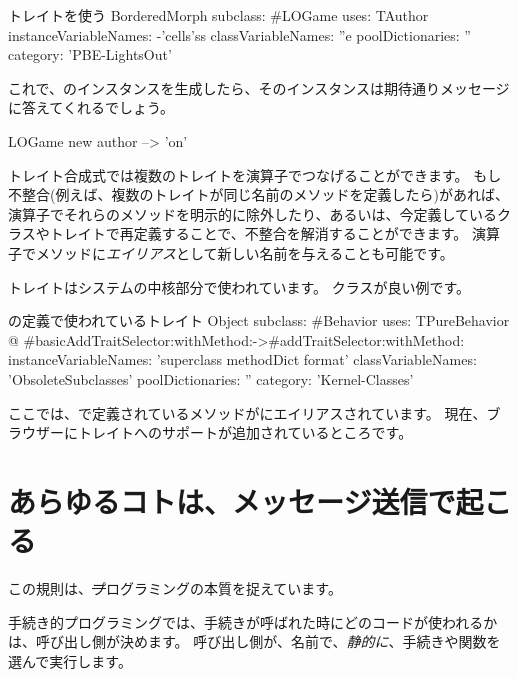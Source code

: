 \documentclass[a4paper,10pt,twoside]{book}
\begin{document}
\begin{classdef}[sbegamewithtrait]{トレイトを使う}
BorderedMorph subclass: #LOGame
	uses: TAuthor
	instanceVariableNames: -'cells'ss
	classVariableNames: ''e
	poolDictionaries: ''
	category: 'PBE-LightsOut'
\end{classdef}

これで、のインスタンスを生成したら、そのインスタンスは期待通りメッセージに答えてくれるでしょう。

\begin{code}{}
LOGame new author --> 'on'
\end{code}

トレイト合成式では複数のトレイトを\ct{+}演算子でつなげることができます。
もし不整合(例えば、複数のトレイトが同じ名前のメソッドを定義したら)があれば、\ct{-}演算子でそれらのメソッドを明示的に除外したり、あるいは、今定義しているクラスやトレイトで再定義することで、不整合を解消することができます。
演算子でメソッドに\emph{エイリアス}として新しい名前を与えることも可能です。

トレイトはシステムの中核部分で使われています。
\mbox{}クラスが良い例です。

\begin{classdef}[behaviorwithtraits]{の定義で使われているトレイト}
Object subclass: #Behavior
	uses: TPureBehavior @ {#basicAddTraitSelector:withMethod:->#addTraitSelector:withMethod:}
	instanceVariableNames: 'superclass methodDict format'
	classVariableNames: 'ObsoleteSubclasses'
	poolDictionaries: ''
	category: 'Kernel-Classes'
\end{classdef}
\noindent
ここでは、で定義されているメソッドがにエイリアスされています。
現在、ブラウザーにトレイトへのサポートが追加されているところです。

\section{あらゆるコトは、メッセージ送信で起こる}


この規則は、\st プログラミングの本質を捉えています。

手続き的プログラミングでは、手続きが呼ばれた時にどのコードが使われるかは、呼び出し側が決めます。
呼び出し側が、名前で、\emph{静的に}、手続きや関数を選んで実行します。
\end{document}
